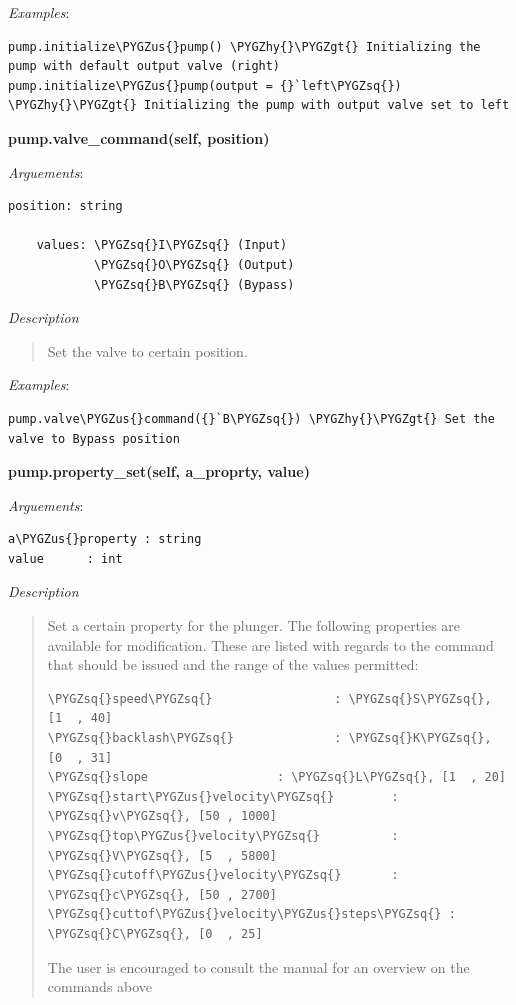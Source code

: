 \documentclass[letterpaper,10pt,english]{sphinxmanual}
\def\PYGZus{\char`\_}
\def\PYGZgt{\char`\>}
\def\PYGZhy{\char`\-}
\def\PYGZsq{\char`\'}
\begin{document}
\emph{Examples}:

\begin{Verbatim}[commandchars=\\\{\}]
pump.initialize\PYGZus{}pump() \PYGZhy{}\PYGZgt{} Initializing the pump with default output valve (right)
pump.initialize\PYGZus{}pump(output = {}`left\PYGZsq{}) \PYGZhy{}\PYGZgt{} Initializing the pump with output valve set to left
\end{Verbatim}

\textbf{pump.valve\_command(self, position)}

\emph{Arguements}:

\begin{Verbatim}[commandchars=\\\{\}]
position: string

    values: \PYGZsq{}I\PYGZsq{} (Input)
            \PYGZsq{}O\PYGZsq{} (Output)
            \PYGZsq{}B\PYGZsq{} (Bypass)
\end{Verbatim}

\emph{Description}
\begin{quote}

Set the valve to certain position.
\end{quote}

\emph{Examples}:

\begin{Verbatim}[commandchars=\\\{\}]
pump.valve\PYGZus{}command({}`B\PYGZsq{}) \PYGZhy{}\PYGZgt{} Set the valve to Bypass position
\end{Verbatim}

\textbf{pump.property\_set(self, a\_proprty, value)}

\emph{Arguements}:

\begin{Verbatim}[commandchars=\\\{\}]
a\PYGZus{}property : string
value      : int
\end{Verbatim}

\emph{Description}
\begin{quote}

Set a certain property for the plunger. The following properties are available for
modification. These are listed with regards to the command that should be issued
and the range of the values permitted:

\begin{Verbatim}[commandchars=\\\{\}]
\PYGZsq{}speed\PYGZsq{}                 : \PYGZsq{}S\PYGZsq{}, [1  , 40]
\PYGZsq{}backlash\PYGZsq{}              : \PYGZsq{}K\PYGZsq{}, [0  , 31]
\PYGZsq{}slope                  : \PYGZsq{}L\PYGZsq{}, [1  , 20]
\PYGZsq{}start\PYGZus{}velocity\PYGZsq{}        : \PYGZsq{}v\PYGZsq{}, [50 , 1000]
\PYGZsq{}top\PYGZus{}velocity\PYGZsq{}          : \PYGZsq{}V\PYGZsq{}, [5  , 5800]
\PYGZsq{}cutoff\PYGZus{}velocity\PYGZsq{}       : \PYGZsq{}c\PYGZsq{}, [50 , 2700]
\PYGZsq{}cuttof\PYGZus{}velocity\PYGZus{}steps\PYGZsq{} : \PYGZsq{}C\PYGZsq{}, [0  , 25]
\end{Verbatim}

The user is encouraged to consult the manual for an overview on the
commands above
\end{quote}
\end{document}
